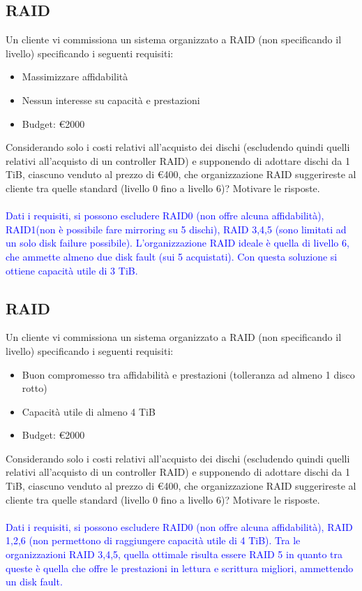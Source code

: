 \documentclass[12pt]{article}
\begin{document}
\subsection{RAID}
Un cliente vi commissiona un sistema organizzato a RAID (non specificando il livello) specificando i seguenti requisiti:
\begin{itemize}
    \item Massimizzare affidabilità
    \item Nessun interesse su capacità e prestazioni
    \item Budget: €2000
\end{itemize}
Considerando solo i costi relativi all'acquisto dei dischi (escludendo quindi quelli relativi all'acquisto di un controller RAID) e supponendo di adottare dischi da 1 TiB, ciascuno venduto al
prezzo di €400, che organizzazione RAID suggerireste al cliente tra quelle standard (livello 0 fino a livello 6)? Motivare le risposte.\\\\
\textcolor{blue}{Dati i requisiti, si possono escludere RAID0 (non offre alcuna affidabilità), RAID1(non è possibile fare mirroring su 5 dischi), RAID 3,4,5 (sono limitati ad un solo disk failure possibile).
L'organizzazione RAID ideale è quella di livello 6, che ammette almeno due disk fault (sui 5 acquistati). Con questa soluzione si ottiene capacità utile di 3 TiB.}
\subsection{RAID}
Un cliente vi commissiona un sistema organizzato a RAID (non specificando il livello) specificando i seguenti requisiti:
\begin{itemize}
    \item Buon compromesso tra affidabilità e prestazioni (tolleranza ad almeno 1 disco rotto)
    \item Capacità utile di almeno 4 TiB
    \item Budget: €2000
\end{itemize}
Considerando solo i costi relativi all'acquisto dei dischi (escludendo quindi quelli relativi all'acquisto di un controller RAID) e supponendo di adottare dischi da 1 TiB, ciascuno venduto al
prezzo di €400, che organizzazione RAID suggerireste al cliente tra quelle standard (livello 0 fino a livello 6)? Motivare le risposte.\\\\
\textcolor{blue}{Dati i requisiti, si possono escludere RAID0 (non offre alcuna affidabilità), RAID 1,2,6 (non permettono di raggiungere capacità utile di 4 TiB).
Tra le organizzazioni RAID 3,4,5, quella ottimale risulta essere RAID 5 in quanto tra queste è quella che offre le prestazioni in lettura e scrittura migliori, ammettendo un disk fault.}
\end{document}
